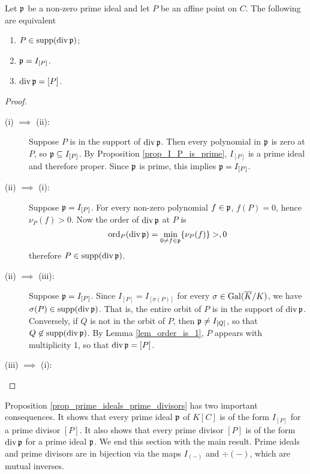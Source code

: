 \begin{proposition}
  \label{prop_prime_ideals_prime_divisors}
  Let $\frak p$ be a non-zero prime ideal and let $P$ be an affine point on $C$.
  The following are equivalent
  \begin{enumerate}[label=(\roman*)]
    \item $P \in \supp(\div \frak p)$;
    \item $\frak p = I_{[P]}$.
    \item $\div \frak p = [P]$.
  \end{enumerate}
\end{proposition}
\begin{proof}
  \begin{description}
    \item [(i) $\implies$ (ii):]
      Suppose $P$ is in the support of $\div \frak p$.
      Then every polynomial in $\frak p$ is zero at $P$, so $\frak p \subseteq I_{[P]}$.
      By Proposition \ref{prop_I_P_is_prime}, $I_{[P]}$ is a prime ideal and therefore proper.
      Since $\frak p$ is prime, this implies $\frak p = I_{[P]}$.

    \item [(ii) $\implies$ (i):]
      Suppose $\frak p = I_{[P]}$.
      For every non-zero polynomial $f \in \frak p$, $f(P) = 0$, hence $\nu_P(f) > 0$.
      Now the order of $\div \frak p$ at $P$ is
      \[ \ord_P(\div \frak p) = \min_{0 \neq f \in \frak p}\{ \nu_P(f) \} > ,0 \]
      therefore $P \in \supp(\div \frak p)$.

    \item [(ii) $\implies$ (iii):]
      Suppose $\frak p = I_{[P]}$.
      Since $I_{[P]} = I_{[\sigma(P)]}$ for every $\sigma \in \Gal(\bar K/K)$,
      we have $\sigma(P) \in \supp(\div \frak p)$.
      That is, the entire orbit of $P$ is in the support of $\div \frak p$.
      Conversely, if $Q$ is not in the orbit of $P$, then $\frak p \neq I_{[Q]}$,
      so that $Q \not \in \supp(\div \frak p)$.
      By Lemma \ref{lem_order_is_1}, $P$ appears with multiplicity 1, so that $\div \frak p = [P]$.
      
    \item [(iii) $\implies$ (i):]
  \end{description}
\end{proof}

Proposition \ref{prop_prime_ideals_prime_divisors} has two important consequences.
It shows that every prime ideal $\frak p$ of $K[C]$ is of the form $I_{[P]}$ for a prime divisor $[P]$.
It also shows that every prime divisor $[P]$ is of the form $\div \frak p$ for a prime ideal $\frak p$.
We end this section with the main result.
Prime ideals and prime divisors are in bijection via the maps $I_{(-)}$ and $\div(-)$, which are mutual inverses.

